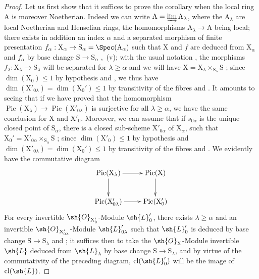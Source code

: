 \begin{proof}
Let us first show that it suffices to prove the corollary when the local ring $\mathrm{A}$ is moreover Noetherian.
Indeed  we can write $\mathrm{A}=\varinjlim\mathrm{A}_\lambda$, where the $\mathrm{A}_\lambda$ are local Noetherian and Henselian rings, the homomorphisms $\mathrm{A}_\lambda\to\mathrm{A}$ being local;
there exists in addition an index $\alpha$ and a separated morphism of finite presentation $f_\alpha:\mathrm{X}_\alpha\to\mathrm{S}_\alpha=\Spec(\mathrm{A}_\alpha)$ such that $\mathrm{X}$ and $f$ are deduced from $\mathrm{X}_\alpha$ and $f_\alpha$ by base change $\mathrm{S}\to\mathrm{S}_\alpha$ ,{}~(v);
with the usual notation , the morphisms $f_\lambda:\mathrm{X}_\lambda\to\mathrm{S}_\lambda$ will be separated for $\lambda\geq\alpha$ and we will have $\mathrm{X}=\mathrm{X}_\lambda\times_{\mathrm{S}_\lambda}\mathrm{S}$ ;
since $\dim(\mathrm{X}_0)\leq 1$ by hypothesis and , we thus have $\dim(\mathrm{X}'_{0\lambda})=\dim(\mathrm{X}_0')\leq 1$ by transitivity of the fibres and .
It amounts to seeing that if we have proved that the homomorphism $\operatorname{Pic}(\mathrm{X}_\lambda)\to\operatorname{Pic}(\mathrm{X}'_{0\lambda})$ is surjective for all $\lambda\geq\alpha$, we have the same conclusion for $\mathrm{X}$ and $\mathrm{X}'_0$.
Moreover, we can assume that if $s_{0\alpha}$ is the unique closed point of $\mathrm{S}_\alpha$, there is a closed sub-scheme $\mathrm{X}'_{0\alpha}$ of $\mathrm{X}_\alpha$, such that $\mathrm{X}_0'=\mathrm{X}'_{0\alpha}\times_{\mathrm{S}_\alpha}\mathrm{S}$ ;
since $\dim(\mathrm{X}'_0)\leq 1$ by hypothesis and $\dim(\mathrm{X}'_{0\lambda})=\dim(\mathrm{X}_0')\leq 1$ by transitivity of the fibres and .
We evidently have the commutative diagram
\[
  \xymatrix{
    \operatorname{Pic}(\mathrm{X}_\lambda) \ar[r] \ar[d] & \operatorname{Pic}(\mathrm{X}) \ar[d]\\
    \operatorname{Pic}(\mathrm{X}'_{0\lambda}) \ar[r] & \operatorname{Pic}(\mathrm{X}_0')
  }
\]
For every invertible $\sh{O}_{\mathrm{X}'_0}$-Module $\sh{L}'_0$, there exists $\lambda\geq\alpha$ and an invertible $\sh{O}_{\mathrm{X}'_{0\lambda}}$-Module $\sh{L}'_{0\lambda}$ such that $\sh{L}'_0$ is deduced by base change $\mathrm{S}\to\mathrm{S}_\lambda$  and ;
it suffices then to take the $\sh{O}_\mathrm{X}$-Module invertible $\sh{L}$ deduced from $\sh{L}_\lambda$ by base change $\mathrm{S}\to\mathrm{S}_\lambda$, and by virtue of the commutativity of the preceding diagram, $\operatorname{cl}(\sh{L}'_0)$ will be the image of $\operatorname{cl}(\sh{L})$.


\end{proof}

